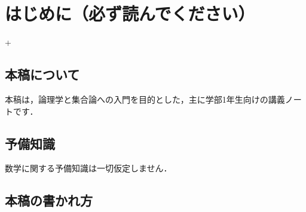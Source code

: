 \chapter*{はじめに（必ず読んでください）}+
\label{chap_intro}

\section*{本稿について}

本稿は，論理学と集合論への入門を目的とした，主に学部1年生向けの講義ノートです．

\section*{予備知識}

数学に関する予備知識は一切仮定しません．

\section*{本稿の書かれ方}

